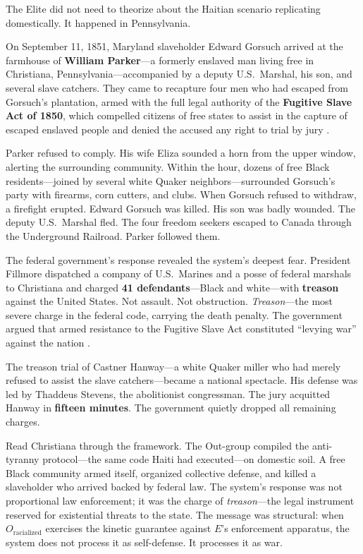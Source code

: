 \documentclass[12pt,openany]{book}
\begin{document}
The Elite did not need to theorize about the Haitian scenario replicating domestically. It happened in Pennsylvania.

On September 11, 1851, Maryland slaveholder Edward Gorsuch arrived at the farmhouse of \textbf{William Parker}---a formerly enslaved man living free in Christiana, Pennsylvania---accompanied by a deputy U.S.\ Marshal, his son, and several slave catchers. They came to recapture four men who had escaped from Gorsuch's plantation, armed with the full legal authority of the \textbf{Fugitive Slave Act of 1850}, which compelled citizens of free states to assist in the capture of escaped enslaved people and denied the accused any right to trial by jury \cite{christiana_history, christiana_zinn}.

Parker refused to comply. His wife Eliza sounded a horn from the upper window, alerting the surrounding community. Within the hour, dozens of free Black residents---joined by several white Quaker neighbors---surrounded Gorsuch's party with firearms, corn cutters, and clubs. When Gorsuch refused to withdraw, a firefight erupted. Edward Gorsuch was killed. His son was badly wounded. The deputy U.S.\ Marshal fled. The four freedom seekers escaped to Canada through the Underground Railroad. Parker followed them.

The federal government's response revealed the system's deepest fear. President Fillmore dispatched a company of U.S.\ Marines and a posse of federal marshals to Christiana and charged \textbf{41 defendants}---Black and white---with \textbf{treason} against the United States. Not assault. Not obstruction. \textit{Treason}---the most severe charge in the federal code, carrying the death penalty. The government argued that armed resistance to the Fugitive Slave Act constituted ``levying war'' against the nation \cite{christiana_history}.

The treason trial of Castner Hanway---a white Quaker miller who had merely refused to assist the slave catchers---became a national spectacle. His defense was led by Thaddeus Stevens, the abolitionist congressman. The jury acquitted Hanway in \textbf{fifteen minutes}. The government quietly dropped all remaining charges.

Read Christiana through the framework. The Out-group compiled the anti-tyranny protocol---the same code Haiti had executed---on domestic soil. A free Black community armed itself, organized collective defense, and killed a slaveholder who arrived backed by federal law. The system's response was not proportional law enforcement; it was the charge of \textit{treason}---the legal instrument reserved for existential threats to the state. The message was structural: when $O_{\text{racialized}}$ exercises the kinetic guarantee against $E$’s enforcement apparatus, the system does not process it as self-defense. It processes it as war.
\end{document}
